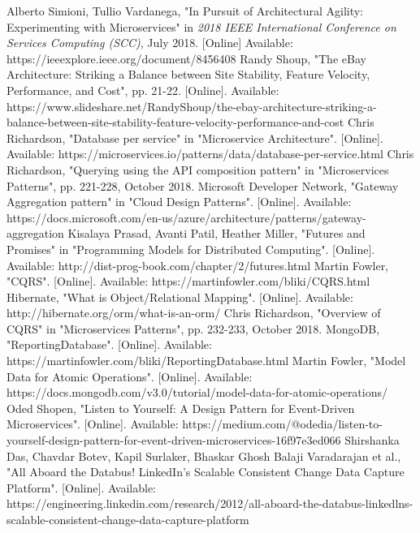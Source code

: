 \documentclass[conference]{IEEEtran}
\begin{document}
\begin{thebibliography}{1}

Alberto Simioni, Tullio Vardanega, "In Pursuit of Architectural Agility: Experimenting with Microservices" in \textit{2018 IEEE International Conference on Services Computing (SCC)}, July 2018. [Online] Available: https://ieeexplore.ieee.org/document/8456408
Randy Shoup, "The eBay Architecture: Striking a Balance between Site Stability, Feature Velocity, Performance, and Cost", pp. 21-22. [Online]. Available: https://www.slideshare.net/RandyShoup/the-ebay-architecture-striking-a-balance-between-site-stability-feature-velocity-performance-and-cost
Chris Richardson, "Database per service" in "Microservice Architecture". [Online]. Available: https://microservices.io/patterns/data/database-per-service.html
Chris Richardson, "Querying using the API composition pattern" in "Microservices Patterns", pp. 221-228, October 2018.
Microsoft Developer Network, "Gateway Aggregation pattern" in "Cloud Design Patterns". [Online]. Available: https://docs.microsoft.com/en-us/azure/architecture/patterns/gateway-aggregation
Kisalaya Prasad, Avanti Patil, Heather Miller, "Futures and Promises" in "Programming Models for Distributed Computing". [Online]. Available: http://dist-prog-book.com/chapter/2/futures.html
Martin Fowler, "CQRS". [Online]. Available: https://martinfowler.com/bliki/CQRS.html
Hibernate, "What is Object/Relational Mapping". [Online]. Available: http://hibernate.org/orm/what-is-an-orm/
Chris Richardson, "Overview of CQRS" in "Microservices Patterns", pp. 232-233, October 2018.
MongoDB, "ReportingDatabase". [Online]. Available: https://martinfowler.com/bliki/ReportingDatabase.html
Martin Fowler, "Model Data for Atomic Operations". [Online]. Available: https://docs.mongodb.com/v3.0/tutorial/model-data-for-atomic-operations/
Oded Shopen, "Listen to Yourself: A Design Pattern for Event-Driven Microservices". [Online]. Available: https://medium.com/@odedia/listen-to-yourself-design-pattern-for-event-driven-microservices-16f97e3ed066
Shirshanka Das, Chavdar Botev, Kapil Surlaker, Bhaskar Ghosh
Balaji Varadarajan et al., "All Aboard the Databus! LinkedIn's Scalable Consistent Change Data Capture Platform". [Online]. Available: https://engineering.linkedin.com/research/2012/all-aboard-the-databus-linkedlns-scalable-consistent-change-data-capture-platform

\end{thebibliography}
\end{document}

